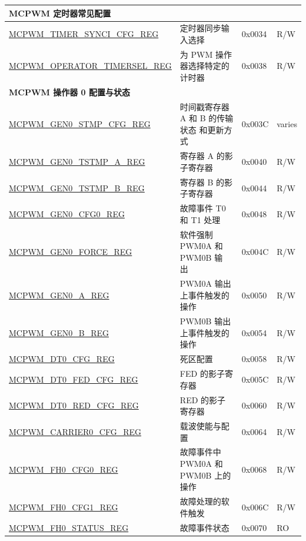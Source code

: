 \begin{longtable}{ | p{6cm} | p{7.2cm} | p{1.2cm} | p{1cm} | }
\multicolumn{4}{|l|}{\textbf{MCPWM 定时器常见配置}} \\ \hline
\hyperref[regdesc:MCPWMTIMERSYNCICFGREG]{MCPWM\_TIMER\_SYNCI\_CFG\_REG} & 定时器同步输入选择 &0x0034 & R/W \\ \hline
\hyperref[regdesc:MCPWMOPERATORTIMERSELREG]{MCPWM\_OPERATOR\_TIMERSEL\_REG} & 为 PWM 操作器选择特定的计时器 & 0x0038 & R/W \\ \hline

\multicolumn{4}{|l|}{\textbf{MCPWM 操作器 0 配置与状态}} \\ \hline
\hyperref[regdesc:MCPWMGENNSTMPCFGREG]{MCPWM\_GEN0\_STMP\_CFG\_REG} & 时间戳寄存器 A 和 B 的传输状态 和更新方式 & 0x003C & varies\\ \hline
\hyperref[regdesc:MCPWMGENNTSTMPAREG]{MCPWM\_GEN0\_TSTMP\_A\_REG} & 寄存器 A 的影子寄存器 & 0x0040 &  R/W \\ \hline
\hyperref[regdesc:MCPWMGENNTSTMPBREG]{MCPWM\_GEN0\_TSTMP\_B\_REG} & 寄存器 B 的影子寄存器 & 0x0044 &  R/W \\ \hline
\hyperref[regdesc:MCPWMGENNCFG0REG]{MCPWM\_GEN0\_CFG0\_REG} & 故障事件 T0 和 T1 处理 & 0x0048 & R/W \\ \hline
\hyperref[regdesc:MCPWMGENNFORCEREG]{MCPWM\_GEN0\_FORCE\_REG} & 软件强制 PWM0A 和 PWM0B 输 出 & 0x004C & R/W \\ \hline
\hyperref[regdesc:MCPWMGENNAREG]{MCPWM\_GEN0\_A\_REG} & PWM0A 输出上事件触发的操作 & 0x0050 &  R/W \\ \hline
\hyperref[regdesc:MCPWMGENNBREG]{MCPWM\_GEN0\_B\_REG} & PWM0B 输出上事件触发的操作 & 0x0054 & R/W \\ \hline
\hyperref[regdesc:MCPWMDTNCFGREG]{MCPWM\_DT0\_CFG\_REG} & 死区配置 & 0x0058 & R/W \\ \hline
\hyperref[regdesc:MCPWMDTNFEDCFGREG]{MCPWM\_DT0\_FED\_CFG\_REG} & FED 的影子寄存器 & 0x005C & R/W \\ \hline
\hyperref[regdesc:MCPWMDTNREDCFGREG]{MCPWM\_DT0\_RED\_CFG\_REG} & RED 的影子寄存器 & 0x0060 &  R/W \\ \hline
\hyperref[regdesc:MCPWMCARRIERNCFGREG]{MCPWM\_CARRIER0\_CFG\_REG} & 载波使能与配置 & 0x0064 & R/W \\ \hline
\hyperref[regdesc:MCPWMFHNCFG0REG]{MCPWM\_FH0\_CFG0\_REG} & 故障事件中 PWM0A 和 PWM0B 上的操作 & 0x0068 &  R/W \\ \hline
\hyperref[regdesc:MCPWMFHNCFG1REG]{MCPWM\_FH0\_CFG1\_REG} & 故障处理的软件触发 & 0x006C &  R/W \\ \hline
\hyperref[regdesc:MCPWMFHNSTATUSREG]{MCPWM\_FH0\_STATUS\_REG} & 故障事件状态 & 0x0070 & RO \\ \hline


\end{longtable}
